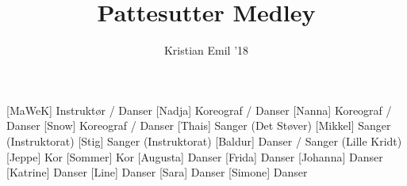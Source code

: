 \documentclass[a4paper,11pt]{article}
\title{Pattesutter Medley}
\author{Kristian Emil '18}
\begin{document}
\maketitle

\begin{roles}
[MaWeK] Instruktør / Danser
[Nadja] Koreograf / Danser
[Nanna] Koreograf / Danser
[Snow] Koreograf / Danser
[Thais] Sanger (Det Støver)
[Mikkel] Sanger (Instruktorat)
[Stig] Sanger (Instruktorat)
[Baldur] Danser / Sanger (Lille Kridt)
[Jeppe] Kor
[Sommer] Kor
[Augusta] Danser
[Frida] Danser
[Johanna] Danser
[Katrine] Danser
[Line] Danser
[Sara] Danser
[Simone] Danser
\end{roles}
\end{document}
